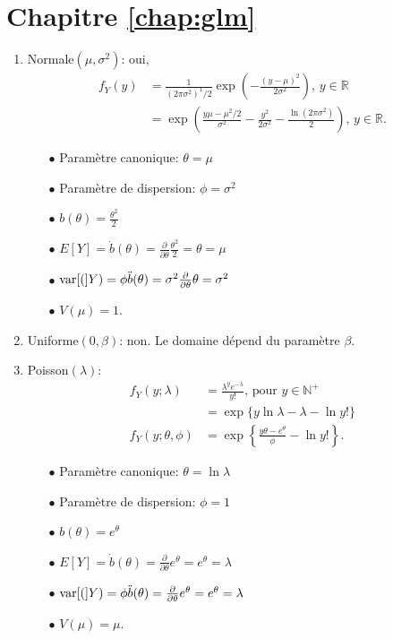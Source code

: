 \section*{Chapitre \ref{chap:glm}}

\begin{solution}{5.1}
\begin{enumerate}
\item Normale$(\mu,\sigma^2)$: oui,
\begin{align*}
f_{Y}(y)&=\frac{1}{(2\pi\sigma^2)^1/2}\exp\left(-\frac{(y-\mu)^2}{2\sigma^2}\right),\, y\in\mathbb{R}\\
&=\exp\left(\frac{y\mu-\mu^2/2}{\sigma^2}-\frac{y^2}{2\sigma^2}-\frac{\ln(2\pi\sigma^2)}{2}\right),\, y\in\mathbb{R}.
\end{align*}
\begin{itemize}
\item[$\bullet$] Paramètre canonique: $\theta=\mu$
\item[$\bullet$] Paramètre de dispersion: $\phi=\sigma^2$
\item[$\bullet$] $b(\theta)=\frac{\theta^2}{2}$
\item[$\bullet$] $E[Y]=\dot{b}(\theta)=\frac{\partial}{\partial\theta}\frac{\theta^2}{2}=\theta=\mu$
\item[$\bullet$] $\mathrm{var} [ ( ]Y)=\phi\ddot{b}(\theta)=\sigma^2\frac{\partial}{\partial\theta}\theta=\sigma^2$
\item[$\bullet$] $V(\mu)=1$.
\end{itemize}

\item Uniforme$(0,\beta)$: non. Le domaine dépend du paramètre $\beta$.
\item Poisson$(\lambda)$:
\begin{align*}
f_{Y}(y;\lambda)&=\frac{\lambda^{y}e^{-\lambda}}{y!} \mbox{, pour }y\in \mathbb{N}^{+}\\
&=\exp\{y\ln \lambda - \lambda - \ln y!\}\\
f_{Y}(y;\theta,\phi)&=\exp\left\{\frac{y\theta - e^{\theta}}{\phi} - \ln y!\right\}.
\end{align*}
\begin{itemize}
\item[$\bullet$] Paramètre canonique: $\theta=\ln \lambda$
\item[$\bullet$] Paramètre de dispersion: $\phi=1$
\item[$\bullet$] $b(\theta)=e^{\theta}$
\item[$\bullet$] $E[Y]=\dot{b}(\theta)=\frac{\partial}{\partial\theta}e^{\theta}=e^{\theta}=\lambda$
\item[$\bullet$] $\mathrm{var} [ ( ]Y)=\phi\ddot{b}(\theta)=\frac{\partial}{\partial\theta}e^{\theta}=e^{\theta}=\lambda$
\item[$\bullet$] $V(\mu)=\mu$.
\end{itemize}


\end{enumerate}
\end{solution}
